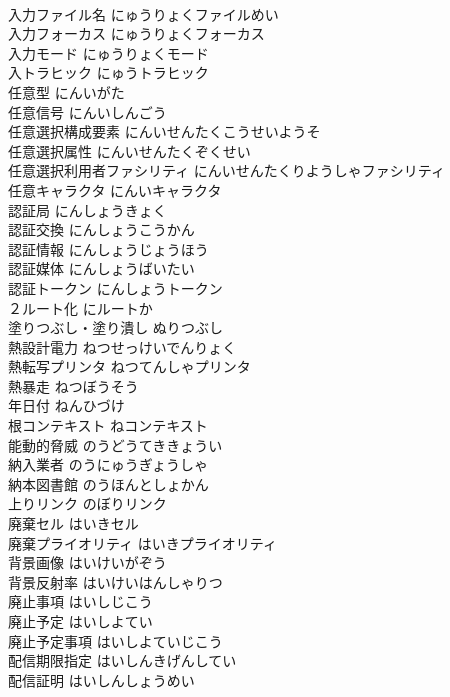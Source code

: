 \documentclass[8pt]{extreport}
\begin{document}
\begin{CJK}{UTF8}{min}
\\	入力ファイル名	にゅうりょくファイルめい	
\\	入力フォーカス	にゅうりょくフォーカス	
\\	入力モード	にゅうりょくモード	
\\	入トラヒック	にゅうトラヒック	
\\	任意型	にんいがた	
\\	任意信号	にんいしんごう	
\\	任意選択構成要素	にんいせんたくこうせいようそ	
\\	任意選択属性	にんいせんたくぞくせい	
\\	任意選択利用者ファシリティ	にんいせんたくりようしゃファシリティ	
\\	任意キャラクタ	にんいキャラクタ	
\\	認証局	にんしょうきょく	
\\	認証交換	にんしょうこうかん	
\\	認証情報	にんしょうじょうほう	
\\	認証媒体	にんしょうばいたい	
\\	認証トークン	にんしょうトークン	
\\	２ルート化	にルートか	
\\	塗りつぶし・塗り潰し	ぬりつぶし	
\\	熱設計電力	ねつせっけいでんりょく	
\\	熱転写プリンタ	ねつてんしゃプリンタ	
\\	熱暴走	ねつぼうそう	
\\	年日付	ねんひづけ	
\\	根コンテキスト	ねコンテキスト	
\\	能動的脅威	のうどうてききょうい	
\\	納入業者	のうにゅうぎょうしゃ	
\\	納本図書館	のうほんとしょかん	
\\	上りリンク	のぼりリンク	
\\	廃棄セル	はいきセル	
\\	廃棄プライオリティ	はいきプライオリティ	
\\	背景画像	はいけいがぞう	
\\	背景反射率	はいけいはんしゃりつ	
\\	廃止事項	はいしじこう	
\\	廃止予定	はいしよてい	
\\	廃止予定事項	はいしよていじこう	
\\	配信期限指定	はいしんきげんしてい	
\\	配信証明	はいしんしょうめい	

\end{CJK}
\end{document}
